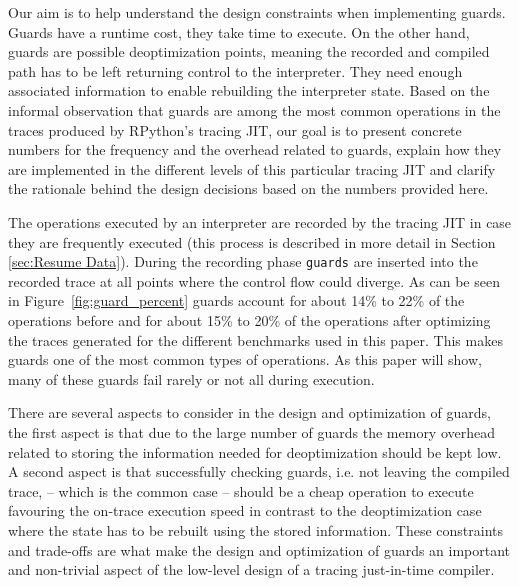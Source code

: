 \documentclass[10pt,preprint]{sigplanconf}
\begin{document}
Our aim is to help understand the design constraints when
implementing guards. Guards have a runtime cost, they take time to execute. On
the other hand, guards are possible deoptimization points, meaning the recorded
and compiled path has to be left returning control to the interpreter. They need
enough associated information to enable rebuilding the interpreter state.
Based on the informal observation that guards are among the most common
operations in the traces produced by RPython's tracing JIT, our
goal is to present concrete numbers for the frequency and the overhead related
to guards, explain how they are implemented in the different levels of this particular
tracing JIT and clarify the rationale behind the design decisions based on the
numbers provided here.

The operations executed by an interpreter are recorded by the tracing JIT in
case they are frequently executed (this process is described in more detail in
Section \ref{sec:Resume Data}). During the recording phase \texttt{guards} are
inserted into the recorded trace at all
points where the control flow could diverge. As can be seen in
Figure~\ref{fig:guard_percent} guards account for about 14\% to 22\% of the
operations before and for about 15\% to 20\% of the operations after
optimizing the traces generated for the different benchmarks used in this paper.
This makes guards one of the most common types of operations. As this paper will show, many of these guards
fail rarely or not all during execution.

There are several aspects to consider
in the design and optimization of guards, the first aspect is that due to the
large number of guards the memory overhead related to storing the information
needed for deoptimization should be kept low. A second aspect is that
successfully checking guards, i.e. not leaving the compiled trace, – which is
the common case – should be a cheap operation to execute favouring the on-trace
execution speed in contrast to the deoptimization case where the state has to
be rebuilt using the stored information. These constraints and trade-offs are
what make the design and optimization of guards an important and non-trivial
aspect of the low-level design of a tracing just-in-time compiler.
\end{document}
